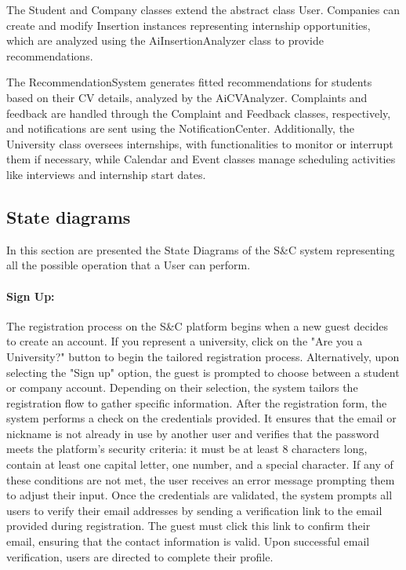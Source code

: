 The Student and Company classes extend the abstract class User. Companies can create and modify Insertion instances representing internship opportunities, which are analyzed using the AiInsertionAnalyzer class to provide recommendations.

The RecommendationSystem generates fitted recommendations for students based on their CV details, analyzed by the AiCVAnalyzer. Complaints and feedback are handled through the Complaint and Feedback classes, respectively, and notifications are sent using the NotificationCenter. Additionally, the University class oversees internships, with functionalities to monitor or interrupt them if necessary, while Calendar and Event classes manage scheduling activities like interviews and internship start dates.


\subsection{State diagrams}
\label{subsec:state_diagrams}%

In this section are presented the State Diagrams of the S\&C system
representing all the possible operation that a User can perform.

\paragraph{Sign Up:} The registration process on the S\&C platform begins
  when a new guest decides to create an account. If you represent a
  university, click on the "Are you a
  University?" button to begin the tailored
  registration process. Alternatively, upon selecting the "Sign up"
  option, the guest is prompted to choose between a student or company
  account. Depending on their selection, the system tailors the
  registration flow to gather specific information. After the
  registration form, the system performs a check on the credentials
  provided. It ensures that the email or nickname is not already in use
  by another user and verifies that the password meets the platform's
  security criteria: it must be at least 8 characters long, contain at
  least one capital letter, one number, and a special character. If any
  of these conditions are not met, the user receives an error message
  prompting them to adjust their input. Once the credentials are
  validated, the system prompts all users to verify their email
  addresses by sending a verification link to the email provided during
  registration. The guest must click this link to confirm their email,
  ensuring that the contact information is valid. Upon successful email
  verification, users are directed to complete their profile.

